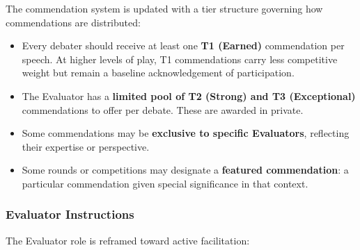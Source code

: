 \documentclass[12pt]{article}
\begin{document}
The commendation system is updated with a tier structure governing how commendations are distributed:

\begin{itemize}
    \item Every debater should receive at least one \textbf{T1 (Earned)} commendation per speech. At higher levels of play, T1 commendations carry less competitive weight but remain a baseline acknowledgement of participation.
    \item The Evaluator has a \textbf{limited pool of T2 (Strong) and T3 (Exceptional)} commendations to offer per debate. These are awarded in private.
    \item Some commendations may be \textbf{exclusive to specific Evaluators}, reflecting their expertise or perspective.
    \item Some rounds or competitions may designate a \textbf{featured commendation}: a particular commendation given special significance in that context.
\end{itemize}

\subsubsection{Evaluator Instructions}

The Evaluator role is reframed toward active facilitation:
\end{document}
